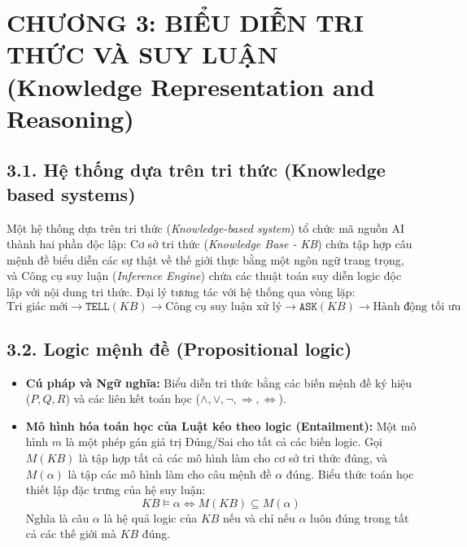 \documentclass[11pt,a4paper]{article}
\begin{document}
\section{CHƯƠNG 3: BIỂU DIỄN TRI THỨC VÀ SUY LUẬN (Knowledge Representation and Reasoning)}

\subsection{3.1. Hệ thống dựa trên tri thức (Knowledge based systems)}
Một hệ thống dựa trên tri thức (\textit{Knowledge-based system}) tổ chức mã nguồn AI thành hai phần độc lập: Cơ sở tri thức (\textit{Knowledge Base - KB}) chứa tập hợp câu mệnh đề biểu diễn các sự thật về thế giới thực bằng một ngôn ngữ trang trọng, và Công cụ suy luận (\textit{Inference Engine}) chứa các thuật toán suy diễn logic độc lập với nội dung tri thức. Đại lý tương tác với hệ thống qua vòng lặp:
\begin{equation}
    \text{Tri giác mới} \xrightarrow{} \texttt{TELL}(KB) \xrightarrow{} \text{Công cụ suy luận xử lý} \xrightarrow{} \texttt{ASK}(KB) \rightarrow \text{Hành động tối ưu}
\end{equation}

\subsection{3.2. Logic mệnh đề (Propositional logic)}
\begin{itemize}
    \item \textbf{Cú pháp và Ngữ nghĩa:} Biểu diễn tri thức bằng các biến mệnh đề ký hiệu ($P, Q, R$) và các liên kết toán học ($\wedge, \vee, \neg, \Rightarrow, \Leftrightarrow$). 
    \item \textbf{Mô hình hóa toán học của Luật kéo theo logic (Entailment):} Một mô hình $m$ là một phép gán giá trị Đúng/Sai cho tất cả các biến logic. Gọi $M(KB)$ là tập hợp tất cả các mô hình làm cho cơ sở tri thức đúng, và $M(\alpha)$ là tập các mô hình làm cho câu mệnh đề $\alpha$ đúng. Biểu thức toán học thiết lập đặc trưng của hệ suy luận:
    \begin{equation}
        KB \models \alpha \iff M(KB) \subseteq M(\alpha)
    \end{equation}
    Nghĩa là câu $\alpha$ là hệ quả logic của $KB$ nếu và chỉ nếu $\alpha$ luôn đúng trong tất cả các thế giới mà $KB$ đúng.
\end{itemize}
\end{document}
